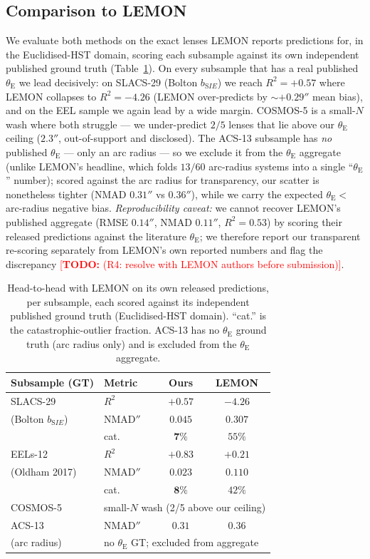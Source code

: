 \documentclass[fleqn,usenatbib]{mnras}
\newcommand{\thetaE}{\theta_{\mathrm{E}}}
\newcommand{\bsie}{b_{\mathrm SIE}}
\newcommand{\todo}[1]{\textcolor{red}{[\textbf{TODO:} #1]}}
\begin{document}
\subsection{Comparison to LEMON}
\label{sec:lemon}
We evaluate both methods on the exact lenses LEMON reports predictions for, in
the Euclidised-HST domain, scoring each subsample against its own independent
published ground truth (Table~\ref{tab:lemon}). On every subsample that has a
real published $\thetaE$ we lead decisively: on SLACS-29 (Bolton $\bsie$) we
reach $R^2=+0.57$ where LEMON collapses to $R^2=-4.26$ (LEMON over-predicts by
${\sim}+0.29''$ mean bias), and on the EEL sample we again lead by a wide margin.
COSMOS-5 is a small-$N$ wash where both struggle --- we under-predict $2/5$
lenses that lie above our $\thetaE$ ceiling ($2.3''$, out-of-support and
disclosed). The ACS-13 subsample has \emph{no} published $\thetaE$ --- only an
arc radius \citep{Pawase2014} --- so we exclude it from the $\thetaE$ aggregate
(unlike LEMON's headline, which folds $13/60$ arc-radius systems into a single
``$\thetaE$'' number); scored against the arc radius for transparency, our
scatter is nonetheless tighter (NMAD $0.31''$ vs $0.36''$), while we carry the
expected $\thetaE<$\,arc-radius negative bias.
\emph{Reproducibility caveat:} we cannot recover LEMON's published aggregate
(RMSE $0.14''$, NMAD $0.11''$, $R^2=0.53$) by scoring their released predictions
against the literature $\thetaE$; we therefore report our transparent re-scoring
separately from LEMON's own reported numbers and flag the discrepancy
\todo{(R4: resolve with LEMON authors before submission)}.

\begin{table}
\centering
\caption{Head-to-head with LEMON on its own released predictions, per subsample,
each scored against its independent published ground truth (Euclidised-HST
domain). ``cat.'' is the catastrophic-outlier fraction. ACS-13 has no $\thetaE$
ground truth (arc radius only) and is excluded from the $\thetaE$ aggregate.}
\label{tab:lemon}
\begin{tabular}{llcc}
\toprule
Subsample (GT) & Metric & \textbf{Ours} & LEMON \\
\midrule
SLACS-29        & $R^2$      & $\mathbf{+0.57}$ & $-4.26$ \\
(Bolton $\bsie$)& NMAD$''$   & $\mathbf{0.045}$ & $0.307$ \\
                & cat.       & $\mathbf{7\%}$   & $55\%$ \\
\midrule
EELs-12         & $R^2$      & $\mathbf{+0.83}$ & $+0.21$ \\
(Oldham 2017)   & NMAD$''$   & $\mathbf{0.023}$ & $0.110$ \\
                & cat.       & $\mathbf{8\%}$   & $42\%$ \\
\midrule
COSMOS-5        & \multicolumn{3}{l}{small-$N$ wash (2/5 above our ceiling)} \\
\midrule
ACS-13          & NMAD$''$   & $\mathbf{0.31}$  & $0.36$ \\
(arc radius)    & \multicolumn{3}{l}{no $\thetaE$ GT; excluded from aggregate} \\
\bottomrule
\end{tabular}
\end{table}
\end{document}
